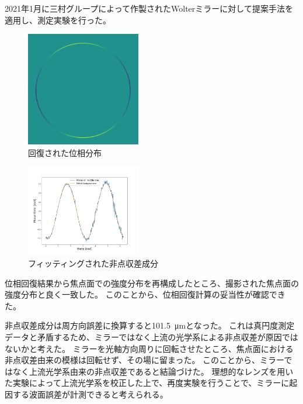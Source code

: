 \documentclass[a4j]{jarticle}
\begin{document}
2021年1月に三村グループによって作製されたWolterミラーに対して提案手法を適用し、測定実験を行った。

\begin{figure}[!ht]
\centering
\includegraphics[width=5cm]{../thesis/chap5/figure/reconstructed_phase_unwrapped.png}
\caption{回復された位相分布}
\label{fig:reconstructed_phase_unwrapped}
\end{figure}

\begin{figure}[!ht]
\centering
\includegraphics[width=5cm]{../thesis/chap5/figure/astigmatism_fitted.png}
\caption{フィッティングされた非点収差成分}
\label{fig:astigmatism_fitted}
\end{figure}

位相回復結果から焦点面での強度分布を再構成したところ、撮影された焦点面の強度分布と良く一致した。
このことから、位相回復計算の妥当性が確認できた。

非点収差成分は周方向誤差に換算すると\SI{101.5}{\micro \metre}となった。
これは真円度測定データと矛盾するため、ミラーではなく上流の光学系による非点収差が原因ではないかと考えた。
ミラーを光軸方向周りに回転させたところ、焦点面における非点収差由来の模様は回転せず、その場に留まった。
このことから、ミラーではなく上流光学系由来の非点収差であると結論づけた。
理想的なレンズを用いた実験によって上流光学系を校正した上で、再度実験を行うことで、ミラーに起因する波面誤差が計測できると考えられる。



\end{document}
